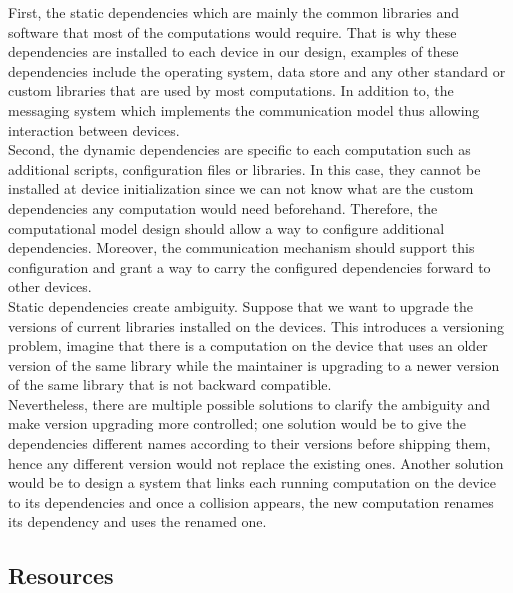 \noindent First, the static dependencies which are mainly the common libraries and software that most of the computations would require. That is why these dependencies are installed to each device in our design, examples of these dependencies include the operating system, data store and any other standard or custom libraries that are used by most computations. In addition to, the messaging system which implements the communication model thus  allowing interaction between devices. \\

\noindent Second, the dynamic dependencies  are specific to each computation such as additional scripts, configuration files or libraries. In this case, they cannot be installed at device initialization since we can not know what are the custom dependencies any computation would need beforehand. Therefore, the computational model design should allow a way to configure additional dependencies. Moreover, the communication mechanism should support this configuration and grant a way to carry the configured dependencies forward to other devices.\\
 
 
\noindent Static dependencies create ambiguity. Suppose that we want to upgrade the versions of current libraries installed on the devices. This introduces a  versioning problem, imagine that there is a computation on the device that uses an older version of the same library while the maintainer is upgrading to a newer version of the same library that is not backward compatible.  \\
  
\noindent Nevertheless, there are multiple possible solutions to clarify the ambiguity and make  version upgrading more controlled; one solution would be to give the dependencies different names according to their versions before shipping them, hence any different version would not replace the existing ones. Another solution would be to design a system that links each running computation on the device to its dependencies and once a collision appears, the new computation renames its dependency and uses the renamed one.
 

	\subsection {Resources}\label{subsec:resources}


